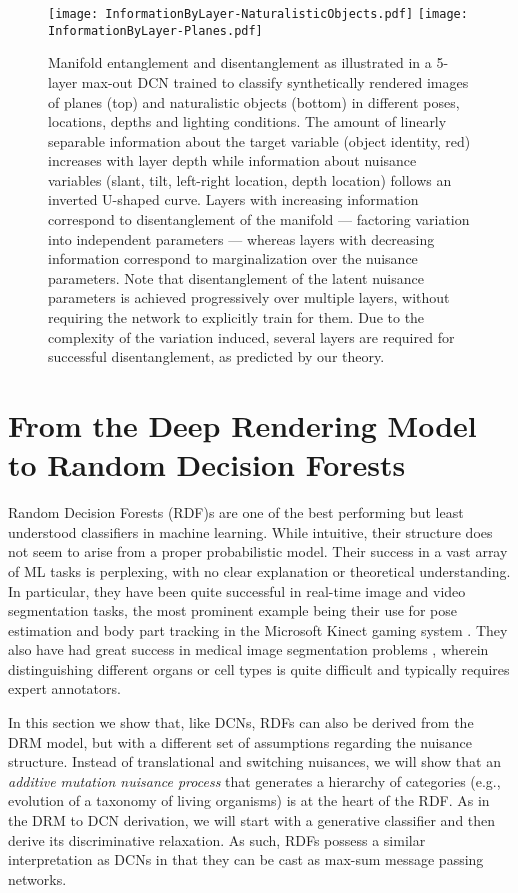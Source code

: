 \documentclass[12pt]{article}
\begin{document}
\begin{figure}
   \centering
   \texttt{[image: InformationByLayer-NaturalisticObjects.pdf]} 
   \texttt{[image: InformationByLayer-Planes.pdf]} 
   \caption{Manifold entanglement and disentanglement as illustrated in a 5-layer max-out DCN trained to classify synthetically rendered images of planes (top) and naturalistic objects (bottom) in different poses, locations, depths and lighting conditions. The amount of linearly separable information about the target variable (object identity, red) increases with layer depth while information about nuisance variables (slant, tilt, left-right location, depth location) follows an inverted U-shaped curve. Layers with increasing information correspond to disentanglement of the manifold --- factoring variation into independent parameters --- whereas layers with decreasing information correspond to marginalization over the nuisance parameters. Note that disentanglement of the latent nuisance parameters is achieved progressively over multiple layers, without requiring the network to explicitly train for them. Due to the complexity of the variation induced, several layers are required for successful disentanglement, as predicted by our theory. }
   \label{fig:entanglement}
\end{figure}


\section{From the Deep Rendering Model to Random Decision Forests} 
\label{sec:rdf}

Random Decision Forests (RDF)s \cite{criminisi2013decision, breiman2001random} are one of the best performing but least understood classifiers in machine learning. While intuitive, their structure does not seem to arise from a proper probabilistic model. Their success in a vast array of ML tasks is perplexing, with no clear explanation or theoretical understanding. In particular, they have been quite successful in real-time image and video segmentation tasks, the most prominent example being their use for pose estimation and body part tracking in the Microsoft Kinect gaming system \cite{pham2015study}. They also have had great success in medical image segmentation problems \cite{criminisi2013decision, breiman2001random}, wherein distinguishing different organs or cell types is quite difficult and typically requires expert annotators.

In this section we show that, like DCNs, RDFs can also be derived from the DRM model, but with a different set of assumptions regarding the nuisance structure. Instead of translational and switching nuisances, we will show that an {\em additive mutation nuisance process} that generates a hierarchy of categories (e.g., evolution of a taxonomy of living organisms) is at the heart of the RDF. 
As in the DRM to DCN derivation, we will start with a generative classifier and then derive its discriminative relaxation. As such, RDFs possess a similar interpretation as DCNs in that they can be cast as max-sum message passing networks.
\end{document}
